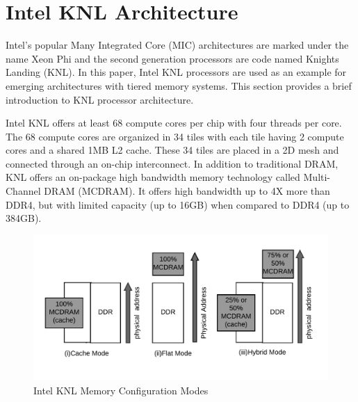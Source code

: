 \section{Intel KNL Architecture}
\label{src:knl}

Intel's popular Many Integrated Core (MIC) architectures are marked
under the name Xeon Phi and the second generation processors are
code
named Knights Landing (KNL). In
this paper, Intel KNL processors are used as an
example for emerging architectures with tiered memory systems. This
section provides a brief introduction to KNL
processor architecture.

Intel KNL offers at least 68 compute cores per chip with four
threads per core. %
The 68 compute cores are organized
in 34 tiles with each tile having 2 compute cores and a shared 1MB
L2 cache. These 34 tiles are placed in a 2D mesh and connected through
an on-chip interconnect. In addition to traditional
DRAM, KNL offers an on-package high bandwidth memory
technology called Multi-Channel DRAM (MCDRAM). It offers high
bandwidth up to 4X more than DDR4, but with limited capacity (up to
16GB) when compared to DDR4 (up to 384GB).

\begin{figure}[!h]
    \vspace{-35pt}
    \hspace*{5mm}
    \includegraphics[scale=0.20]{image/mem-mode.png}
    \vspace{-25pt}
    \caption{Intel KNL Memory Configuration Modes}
    \vspace{-25pt}
    \label{fig:memmode}
\end{figure}


